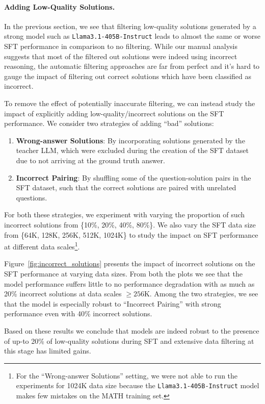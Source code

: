 








\paragraph{Adding Low-Quality Solutions.}


In the previous section, we see that filtering low-quality solutions generated by a strong model such as \texttt{Llama3.1-405B-Instruct} leads to almost the same or worse SFT performance in comparison to no filtering. 
While our manual analysis suggests that most of the filtered out solutions were indeed using incorrect reasoning, the automatic filtering approaches are far from perfect and it's hard to gauge the impact of filtering out correct solutions which have been classified as incorrect. 

To remove the effect of potentially inaccurate filtering, we can instead study the impact of explicitly adding low-quality/incorrect solutions on the SFT performance. 
We consider two strategies of adding ``bad'' solutions:
\begin{enumerate}
    \item \textbf{Wrong-answer Solutions}: By incorporating solutions generated by the teacher LLM, which were excluded during the creation of the SFT dataset due to not arriving at the ground truth answer.
    \item \textbf{Incorrect Pairing}: 
    By shuffling some of the question-solution pairs in the SFT dataset, such that the correct solutions are paired with unrelated questions.  
\end{enumerate}

For both these strategies, we experiment with varying the proportion of such incorrect solutions from \{10\%, 20\%, 40\%, 80\%\}. 
We also vary the SFT data size from  \{64K, 128K, 256K, 512K, 1024K\} to study the impact on SFT performance at different data scales\footnote{For the ``Wrong-answer Solutions'' setting, we were not able to run the experiments for 1024K data size because the \texttt{Llama3.1-405B-Instruct} model makes few mistakes on the MATH training set.}.  

Figure~\ref{fig:incorrect_solutions} presents the impact of incorrect solutions on the SFT performance at varying data sizes. 
From both the plots we see that the model performance suffers little to no performance degradation with as much as 20\% incorrect solutions at data scales $\ge 256$K. Among the two strategies, we see that the model is especially robust to ``Incorrect Pairing'' with strong performance even with 40\% incorrect solutions. 

Based on these results we conclude that models are indeed robust to the presence of up-to 20\% of low-quality solutions during SFT and extensive data filtering at this stage has limited gains.
